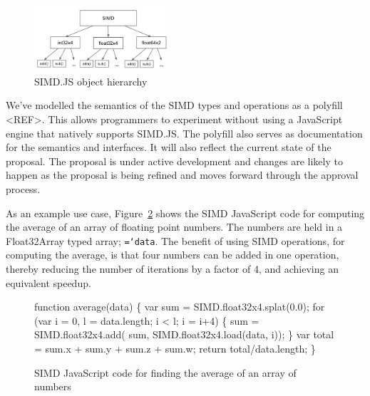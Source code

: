 \documentclass[preprint]{sigplanconf}
\newcommand{\ttt}[1]{{\texttt{\hyphenchar\font=`\-\relax #1}}}%
\begin{document}
\begin{figure}
\begin{center}
\includegraphics[width=0.45\textwidth]{figures/hierarchy.png}
\end{center}
\caption{SIMD.JS object hierarchy}
\label{fig:hierarchy}
\end{figure}

We've modelled the semantics of the SIMD types and operations as a polyfill 
<REF>.  This allows programmers to experiment without using a JavaScript
engine that natively supports SIMD.JS.  The polyfill also serves as documentation
for the semantics and interfaces.  It will also reflect the current state of
the proposal.  The proposal is under active development and changes are likely to 
happen as the proposal is being refined and moves forward through the approval
process.

As an example use case, Figure~\ref{fig:average-simd} shows the SIMD JavaScript
code for computing the average of an array of floating point numbers.  The numbers
are held in a Float32Array typed array; \ttt{data}.  The benefit of using SIMD 
operations, for computing the average, is that four numbers can be added in one
operation, thereby reducing the number of iterations by a factor of 4, and 
achieving an equivalent speedup.

\begin{figure}
\begin{small}
\begin{program}[style=tt, number=true]
fu\tab{}nction average(data) \{
  var sum = SIMD.float32x4.splat(0.0);
  fo\tab{}r (var i = 0, l = data.length; i < l; i = i+4) \{
    su\tab{}m = SIMD.float32x4.add(
      sum, SIMD.float32x4.load(data, i));\untab{}\untab{}
  \}
  var total = sum.x + sum.y + sum.z + sum.w;
  return total/data.length;\untab{}
\}
\end{program}
\end{small}
\caption{SIMD JavaScript code for finding the average of an array of numbers}
\label{fig:average-simd}
\end{figure}
\end{document}
